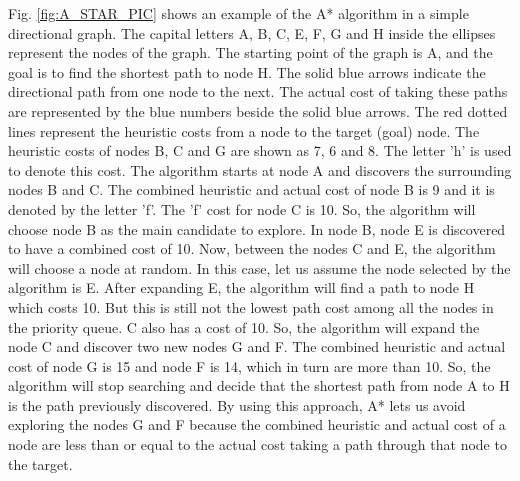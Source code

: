 Fig. \ref{fig:A_STAR_PIC} shows an example of the A* algorithm in a simple directional graph. The capital letters A, B, C, E, F, G and H inside the ellipses represent the nodes of the graph. The starting point of the graph is A, and the goal is to find the shortest path to node H. The solid blue arrows indicate the directional path from one node to the next. The actual cost of taking these paths are represented by the blue numbers beside the solid blue arrows. The red dotted lines represent the heuristic costs from a node to the target (goal) node. The heuristic costs of nodes B, C and G are shown as 7, 6 and 8. The letter 'h' is used to denote this cost. The algorithm starts at node A and discovers the surrounding nodes B and C. The combined heuristic and actual cost of node B is 9 and it is denoted by the letter 'f'. The 'f' cost for node C is 10. So, the algorithm will choose node B as the main candidate to explore. In node B, node E is discovered to have a combined cost of 10. Now, between the nodes C and E, the algorithm will choose a node at random. In this case, let us assume the node selected by the algorithm is E. After expanding E, the algorithm will find a path to node H which costs 10. But this is still not the lowest path cost among all the nodes in the priority queue. C also has a cost of 10. So, the algorithm will expand the node C and discover two new nodes G and F. The combined heuristic and actual cost of node G is 15 and node F is 14, which in turn are more than 10. So, the algorithm will stop searching and decide that the shortest path from node A to H is the path previously discovered. By using this approach, A* lets us avoid exploring the nodes G and F because the combined heuristic and actual cost of a node are less than or equal to the actual cost taking a path through that node to the target.





